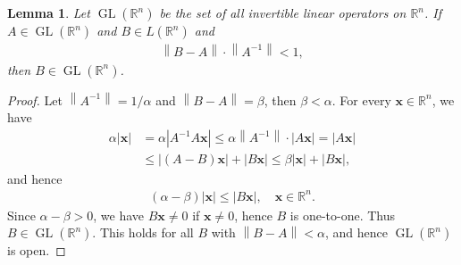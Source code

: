 \documentclass[10pt]{book}
\newtheorem{lemma}{Lemma}[chapter]
\theoremstyle{definition}
\numberwithin{equation}{chapter}
\begin{document}
\begin{lemma}\label{lemma_71}
Let $\operatorname{GL}(\mathbb{R}^n)$ be the set of all invertible linear operators on $\mathbb{R}^n$. If $A \in \operatorname{GL}(\mathbb{R}^n)$ and $B \in L(\mathbb{R}^n)$ and 
\begin{align*}
    \left\|B - A\right\| \cdot \left\|A^{-1}\right\| < 1,
\end{align*}
then $B \in \operatorname{GL}(\mathbb{R}^n)$.
\end{lemma}
\begin{proof}
Let $\left\|A^{-1}\right\| = 1/\alpha$ and $\left\|B - A\right\| = \beta$, then $\beta < \alpha$. For every $\mathbf{x} \in \mathbb{R}^n$, we have
\begin{align*}
    \alpha \left|\mathbf{x}\right| & = \alpha \left|A^{-1} A \mathbf{x}\right| \leq \alpha \left\|A^{-1}\right\| \cdot \left|A\mathbf{x}\right| = \left|A\mathbf{x}\right| \\
    & \leq \left|(A - B)\mathbf{x}\right| + \left|B\mathbf{x}\right| \leq \beta \left|\mathbf{x}\right| + \left|B\mathbf{x}\right|,
\end{align*}
and hence
\begin{align}\label{lemma_71_equ1}
    (\alpha - \beta)\left|\mathbf{x} \right| \leq \left|B\mathbf{x}\right|, \quad \mathbf{x} \in \mathbb{R}^n.
\end{align}
Since $\alpha - \beta > 0$, we have $B\mathbf{x} \neq 0$ if $\mathbf{x} \neq 0$, hence $B$ is one-to-one. Thus $B \in \operatorname{GL}(\mathbb{R}^n)$. This holds for all $B$ with $\left\|B - A\right\| < \alpha$, and hence $\operatorname{GL}(\mathbb{R}^n)$ is open.
\end{proof}

\medskip
\end{document}
